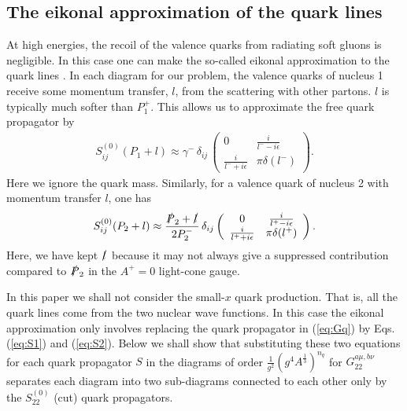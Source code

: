 \documentclass[onecolumn,showpacs,nobibnotes,nofootinbib,12pt,aps,prd,showpacs,notitlepage,nofootinbib,preprintnumbers,amsmath,amssymb]{article}
\begin{document}

\subsection{The eikonal approximation of the quark lines}

At high energies, the recoil of the valence quarks from radiating soft
gluons is negligible. In this case one can make the so-called eikonal
approximation to the quark lines
\cite{Mueller:1989st,McLerran:1993ni,McLerran:1994vd,Kovchegov:1996ty}. In
each diagram for our problem, the valence quarks of nucleus 1 receive
some momentum transfer, $l$, from the scattering with other
partons. $l$ is typically much softer than $P_1^+$. This allows us to
approximate the free quark propagator by
\begin{align}
  S^{(0)}_{ij} (P_1+l)\approx \gamma^- \, \delta_{ij} \,
  \left(\begin{array}{cc}
      0&\frac{i}{l^--i\epsilon}\\
      \frac{i}{l^-+i\epsilon}&\pi\delta(l^-)
\end{array}\right).\label{eq:S1}
\end{align}  
Here we ignore the quark mass. Similarly, for a valence quark of
nucleus 2 with momentum transfer $l$, one has
\begin{align}
  S^{(0)}_{ij} (P_2+l)\approx \frac{\slashed{P}_2+\slashed{l}}{2P_2^-}
  \, \delta_{ij} \left(\begin{array}{cc}
      0&\frac{i}{l^+-i\epsilon}\\
      \frac{i}{l^++i\epsilon}&\pi\delta(l^+)
\end{array}\right).\label{eq:S2}
\end{align}
Here, we have kept $\slashed{l}$ because it may not always give a
suppressed contribution compared to $\slashed{P}_2$ in the $A^+=0$
light-cone gauge.

In this paper we shall not consider the small-$x$ quark
production. That is, all the quark lines come from the two nuclear
wave functions. In this case the eikonal approximation only involves
replacing the quark propagator in (\ref{eq:Gq}) by Eqs. (\ref{eq:S1})
and (\ref{eq:S2}). Below we shall show that substituting these two
equations for each quark propagator $S$ in the diagrams of order
$\frac{1}{g^2} (g^4 A^{\frac{1}{3}})^{n_q}$ for $G_{22}^{a\mu,b\nu}$
separates each diagram into two sub-diagrams connected to each other
only by the $S^{(0)}_{22}$ (cut) quark propagators. 
\end{document}

